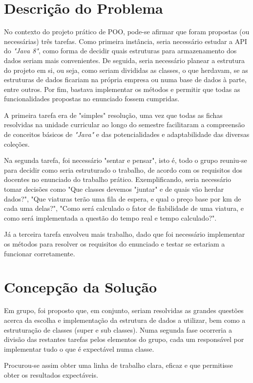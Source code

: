 \documentclass[a4paper]{article}
\begin{document}
\section{Descrição do Problema}
\label{sec:2}

\hspace{3mm} No contexto do projeto prático de POO, pode-se afirmar que foram propostas (ou necessárias) três tarefas. Como primeira instância, seria necessário estudar a API do \emph{"Java 8"}, como forma de decidir quais estruturas para armazenamento dos dados seriam mais convenientes. De seguida, seria necessário planear a estrutura do projeto em si, ou seja, como seriam divididas as classes, o que herdavam, se as estruturas de dados ficariam na própria empresa ou numa base de dados à parte, entre outros. Por fim, bastava implementar os métodos e permitir que todas as funcionalidades propostas no enunciado fossem cumpridas.
\par A primeira tarefa era de "simples" resolução, uma vez que todas as fichas resolvidas na unidade curricular ao longo do semestre facilitaram a compreensão de conceitos básicos de \emph{"Java"} e das potencialidades e adaptabilidade das diversas coleções.
\par Na segunda tarefa, foi necessário "sentar e pensar", isto é, todo o grupo reuniu-se para decidir como seria estruturado o trabalho, de acordo com os requisitos dos docentes no enunciado do trabalho prático. Exemplificando, seria necessário tomar decisões como "Que classes devemos "juntar" e de quais vão herdar dados?", "Que viaturas terão uma fila de espera, e qual o preço base por km de cada uma delas?", "Como será calculado o fator de fiabilidade de uma viatura, e como será implementada a questão do tempo real e tempo calculado?".
\par Já a terceira tarefa envolveu mais trabalho, dado que foi necessário implementar os métodos para resolver os requisitos do enunciado e testar se estariam a funcionar corretamente.


\section{Concepção da Solução}
\label{sec:3}

\hspace{3mm} Em grupo, foi proposto que, em conjunto, seriam resolvidas as grandes questões acerca da escolha e implementação da estrutura de dados a utilizar, bem como a estruturação de classes (super e sub classes). Numa segunda fase ocorreria a divisão das restantes tarefas pelos elementos do grupo, cada um responsável por implementar tudo o que é expectável numa classe.
\par Procurou-se assim obter uma linha de trabalho clara, eficaz e que permitisse obter os resultados expectáveis.
\end{document}

